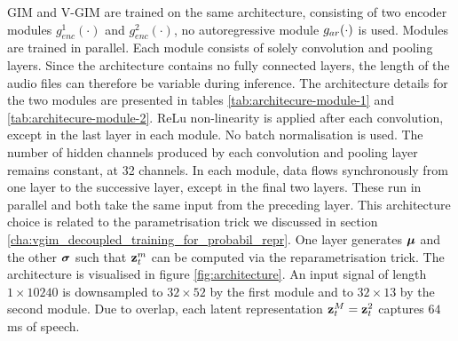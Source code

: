 		GIM and V-GIM are trained on the same architecture, consisting of two encoder modules $g_{enc}^1(\cdot)$ and $g_{enc}^2(\cdot)$, no autoregressive module $g_{ar}(\cdot)$ is used. Modules are trained in parallel. Each module consists of solely convolution and pooling layers. Since the architecture contains no fully connected layers, the length of the audio files can therefore be variable during inference. The architecture details for the two modules are presented in tables \ref{tab:architecure-module-1} and \ref{tab:architecure-module-2}. ReLu non-linearity is applied after each convolution, except in the last layer in each module. No batch normalisation is used. The number of hidden channels produced by each convolution and pooling layer remains constant, at 32 channels. In each module, data flows synchronously from one layer to the successive layer, except in the final two layers. These run in parallel and both take the same input from the preceding layer. This architecture choice is related to the parametrisation trick we discussed in section \ref{cha:vgim_decoupled_training_for_probabil_repr}. One layer generates $\bm{\mu}$ and the other $\bm{\sigma}$ such that $\mathbf{z}_t^{m}$ can be computed via the reparametrisation trick. The architecture is visualised in figure \ref{fig:architecture}. 
		An input signal of length $1 \times 10240$ is downsampled to $32 \times 52$ by the first module and to $32 \times 13$ by the second module. Due to overlap, each latent representation $\mathbf{z}_t^M = \mathbf{z}_t^2$ captures $64$ms of speech. %
		

	
		

